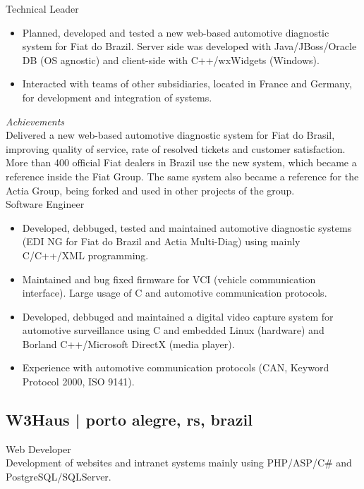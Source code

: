 \documentclass[10pt,a4paper]{article}
\newcommand{\years}[1]{\marginnote{#1}}
\begin{document}
{\years{2007-2010}Technical Leader
\begin{itemize}
\item Planned, developed and tested a new web-based automotive diagnostic system for Fiat do Brazil. Server side was developed with Java/JBoss/Oracle DB (OS agnostic) and client-side with C++/wxWidgets (Windows).
\item Interacted with teams of other subsidiaries, located in France and Germany, for development and integration of systems.
\end{itemize}

\emph{Achievements}\\
Delivered a new web-based automotive diagnostic system for Fiat do Brasil, improving quality of service, rate of resolved tickets and customer satisfaction. More than 400 official Fiat dealers in Brazil use the new system, which became a reference inside the Fiat Group. The same system also became a reference for the Actia Group, being forked and used in other projects of the group.\\

\years{2005-2007}Software Engineer
\begin{itemize}
\item Developed, debbuged, tested and maintained automotive diagnostic systems (EDI NG for Fiat do Brazil and Actia Multi-Diag) using mainly C/C++/XML programming.
\item Maintained and bug fixed firmware for VCI (vehicle communication interface). Large usage of C and automotive communication protocols.
\item Developed, debbuged and maintained a digital video capture system for automotive surveillance using C and embedded Linux (hardware) and Borland C++/Microsoft DirectX (media player).
\item Experience with automotive communication protocols (CAN, Keyword Protocol 2000, ISO 9141).
\end{itemize}

\subsection*{W3Haus | {\footnotesize{porto alegre, rs, brazil}}}

\years{2003-2005}Web Developer\\
Development of websites and intranet systems mainly using PHP/ASP/C\# and PostgreSQL/SQLServer.

}
\end{document}
